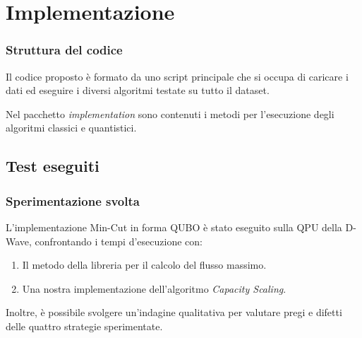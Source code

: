 \documentclass[10pt]{beamer}
\begin{document}
\section{Implementazione}
\begin{frame}
  \frametitle{Struttura del codice}

  Il codice proposto è formato da uno script principale che si occupa di caricare i dati ed eseguire i diversi algoritmi testate su tutto il dataset.

  Nel pacchetto \emph{implementation} sono contenuti i metodi per l'esecuzione degli algoritmi classici e quantistici.

\end{frame}
\subsection{Test eseguiti}
\begin{frame}
  \frametitle{Sperimentazione svolta}

  L'implementazione Min-Cut in forma QUBO è stato eseguito sulla QPU della D-Wave, confrontando i tempi d'esecuzione con:
  
  \begin{enumerate}
    \item Il metodo della libreria per il calcolo del flusso massimo.
    \item Una nostra implementazione dell'algoritmo \emph{Capacity Scaling}.
  \end{enumerate} 

  Inoltre, è possibile svolgere un'indagine qualitativa per valutare pregi e difetti delle quattro strategie sperimentate.

\end{frame}
\end{document}

